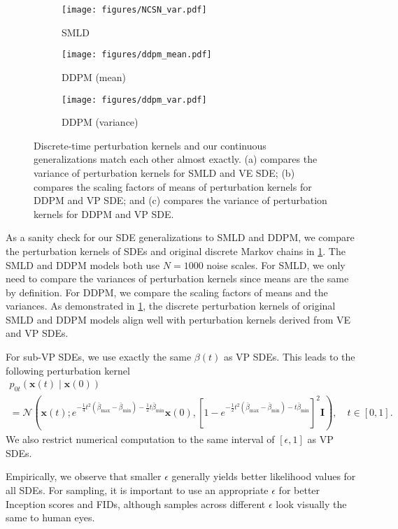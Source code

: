 \documentclass{article} \usepackage{iclr2021_conference,times}
\newcommand{\mcal}{\mathcal}
\newcommand{\bfx}{\mathbf{x}}
\newcommand{\bfI}{\mathbf{I}}
\newcommand{\bbeta}{\bar{\beta}}
\newcommand{\bbetam}{\bbeta_{\text{min}}}
\newcommand{\bbetaM}{\bbeta_{\text{max}}}
\begin{document}
\begin{figure}
    \centering
    \begin{subfigure}{0.333\linewidth}
        \texttt{[image: figures/NCSN\_var.pdf]}\caption{SMLD}
    \end{subfigure}
    \begin{subfigure}{0.32\linewidth}
        \texttt{[image: figures/ddpm\_mean.pdf]}\caption{DDPM (mean)}
    \end{subfigure}
    \begin{subfigure}{0.32\linewidth}
        \texttt{[image: figures/ddpm\_var.pdf]}
        \caption{DDPM (variance)}
    \end{subfigure}
    \caption{Discrete-time perturbation kernels and our continuous generalizations match each other almost exactly. (a) compares the variance of perturbation kernels for SMLD and VE SDE; (b) compares the scaling factors of means of perturbation kernels for DDPM and VP SDE; and (c) compares the variance of perturbation kernels for DDPM and VP SDE.}
    \label{fig:discretization}
\end{figure}
As a sanity check for our SDE generalizations to SMLD and DDPM, we compare the perturbation kernels of SDEs and original discrete Markov chains in \cref{fig:discretization}. The SMLD and DDPM models both use $N=1000$ noise scales. For SMLD, we only need to compare the variances of perturbation kernels since means are the same by definition. For DDPM, we compare the scaling factors of means and the variances. As demonstrated in \cref{fig:discretization}, the discrete perturbation kernels of original SMLD and DDPM models align well with perturbation kernels derived from VE and VP SDEs.

For sub-VP SDEs, we use exactly the same $\beta(t)$ as VP SDEs. This leads to the following perturbation kernel
\begin{multline}
    p_{0t}(\bfx(t) \mid \bfx(0)) \\
    = \mcal{N}\left(\bfx(t) ; e^{-\frac{1}{4}t^2(\bbetaM-\bbetam) - \frac{1}{2}t\bbetam}\bfx(0), [1 - e^{-\frac{1}{2}t^2(\bbetaM -\bbetam) - t\bbetam}]^2 \bfI \right), \quad t\in[0,1].
\end{multline}
We also restrict numerical computation to the same interval of $[\epsilon, 1]$ as VP SDEs.

Empirically, we observe that smaller $\epsilon$ generally yields better likelihood values for all SDEs. For sampling, it is important to use an appropriate $\epsilon$ for better Inception scores and FIDs, although samples across different $\epsilon$ look visually the same to human eyes.
\end{document}
